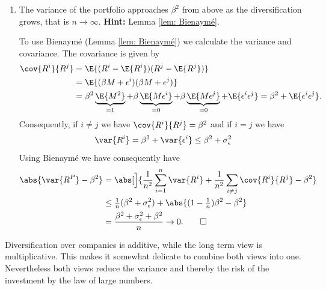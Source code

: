 \begin{exercise}
\begin{enumerate}[label=(\alph*),noitemsep]
        \item The variance of the portfolio approaches \(\beta^2\) from above as the
        diversification grows, that is \(n\to \infty\). 
        \textbf{Hint:} Lemma \ref{lem: Bienaymé}.
        \begin{solution}
            To use Bienaymé (Lemma \ref{lem: Bienaymé}) we calculate the
            variance and covariance. The covariance is given by
            \begin{align*}
                \cov{R^i}{R^j}
                &= \E{(R^i - \E{R^i})(R^j - \E{R^j})}
                \\
                &= \E{(\beta M + \epsilon^i)(\beta M + \epsilon^j)}
                \\
                &= \beta^2 \underbrace{\E{M^2}}_{=1} + \beta \underbrace{\E{M\epsilon^i}}_{=0} +
                \beta \underbrace{\E{M\epsilon^j}}_{=0} +
                \E{\epsilon^i\epsilon^j}
                = \beta^2 + \E{\epsilon^i\epsilon^j}.
            \end{align*}
            Consequently, if \(i \neq j\) we have \(\cov{R^i}{R^j} = \beta^2\) and if \(i=j\) we have
            \[
                \var{R^i} = \beta^2 + \var{\epsilon^i} \le \beta^2 + \sigma_\epsilon^2
            \]
            Using Bienaymé we have consequently have
            \begin{align*}
                \abs{\var{R^P} - \beta^2}
                &= \abs[\Big]{\frac1{n^2}\sum_{i=1}^n \var{R^i} + \frac1{n^2}\sum_{i\neq j} \cov{R^i}{R^j} - \beta^2}
                \\
                &\le \tfrac1{n}(\beta^2 + \sigma_\epsilon^2) + \abs{(1-\tfrac1{n})\beta^2 - \beta^2}
                \\
                &= \frac{\beta^2 + \sigma_\epsilon^2 + \beta^2}{n}
                \to 0.
                \qedhere
            \end{align*}
        \end{solution}

    \end{enumerate}
\end{exercise}

\begin{remark}
    Diversification over companies is additive, while the long term view
    is multiplicative. This makes it somewhat delicate to combine both views
    into one. Nevertheless both views reduce the variance and thereby the risk
    of the investment by the law of large numbers.
\end{remark}


